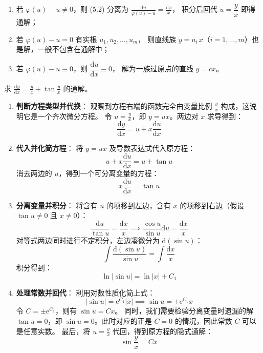 \documentclass[lang=cn,11pt]{elegantbook}
\begin{document}
\begin{property}[齐次方程的完整解法]
\begin{enumerate}
  \item 若 $\varphi(u)-u\neq 0$，则 (5.2) 分离为
        $\displaystyle\frac{\mathrm{d}u}{\varphi(u)-u}=\frac{\mathrm{d}x}{x}$，
        积分后回代 $u=\dfrac{y}{x}$ 即得通解；
  \item 若 $\varphi(u)-u=0$ 有实根 $u_1,u_2,\dots,u_m$，
        则直线族 $y=u_i\,x$（$i=1,\dots,m$）也是解，一般不包含在通解中；
  \item 若 $\varphi(u)-u\equiv 0$，则 $\dfrac{\mathrm{d}u}{\mathrm{d}x}\equiv 0$，
        解为一族过原点的直线 $y=cx$。
\end{enumerate}
\end{property}

\begin{exercise}
求 $\displaystyle\frac{\mathrm{d}y}{\mathrm{d}x}=\frac{y}{x}+\tan\frac{y}{x}$ 的通解。
\end{exercise}
\begin{solution}
\begin{enumerate}
    \item \textbf{判断方程类型并代换}：
    观察到方程右端的函数完全由变量比例 $\frac{y}{x}$ 构成，这说明它是一个齐次微分方程。
    令 $u=\frac{y}{x}$，即 $y=ux$。两边对 $x$ 求导得到：
    \[
    \frac{\mathrm{d}y}{\mathrm{d}x} = u + x\frac{\mathrm{d}u}{\mathrm{d}x}
    \]
    \item \textbf{代入并化简方程}：
    将 $y=ux$ 及导数表达式代入原方程：
    \[
    u + x\frac{\mathrm{d}u}{\mathrm{d}x} = u + \tan u
    \]
    消去两边的 $u$，得到一个可分离变量的方程：
    \[
    x\frac{\mathrm{d}u}{\mathrm{d}x} = \tan u
    \]
    \item \textbf{分离变量并积分}：
    将含有 $u$ 的项移到左边，含有 $x$ 的项移到右边（假设 $\tan u \neq 0$ 且 $x \neq 0$）：
    \[
    \frac{\mathrm{d}u}{\tan u} = \frac{\mathrm{d}x}{x} \implies \frac{\cos u}{\sin u}\mathrm{d}u = \frac{\mathrm{d}x}{x}
    \]
    对等式两边同时进行不定积分，左边凑微分为 $\mathrm{d}(\sin u)$：
    \[
    \int \frac{\mathrm{d}(\sin u)}{\sin u} = \int \frac{\mathrm{d}x}{x}
    \]
    积分得到：
    \[
    \ln|\sin u| = \ln|x| + C_1
    \]
    \item \textbf{处理常数并回代}：
    利用对数性质化简上式：
    \[
    |\sin u| = \mathrm{e}^{C_1}|x| \implies \sin u = \pm\mathrm{e}^{C_1}x
    \]
    令 $C = \pm\mathrm{e}^{C_1}$，则有 $\sin u = Cx$。
    同时，我们需要检验分离变量时遗漏的解 $\tan u = 0$，即 $\sin u = 0$。此时对应的正是 $C=0$ 的情况，因此常数 $C$ 可以是任意实数。
    最后，将 $u = \frac{y}{x}$ 代回，得到原方程的隐式通解：
    \[
    \boxed{\sin\frac{y}{x} = Cx}
    \]
\end{enumerate}
\end{solution}
\end{document}
